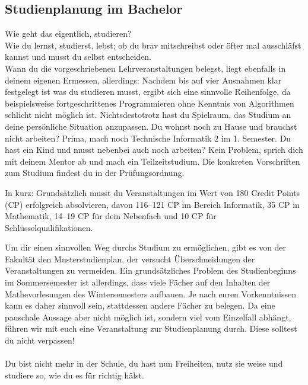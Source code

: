 \subsection{Studienplanung im Bachelor}

Wie geht das eigentlich, studieren?\\
Wie du lernst, studierst, lebst; ob du brav mitschreibst oder öfter mal ausschläfst kannst und musst du selbst entscheiden. \\
Wann du die vorgeschriebenen Lehrveranstaltungen belegst, liegt ebenfalls in deinem eigenen Ermessen, allerdings: Nachdem bis auf vier Ausnahmen klar festgelegt ist was du studieren musst, ergibt sich eine sinnvolle Reihenfolge, da beispielsweise fortgeschrittenes Programmieren ohne Kenntnis von Algorithmen schlicht nicht möglich ist. Nichtsdestotrotz hast du Spielraum, das Studium an deine persönliche Situation anzupassen.
Du wohnst noch zu Hause und brauchst nicht arbeiten? Prima, mach noch Technische Informatik 2 im 1. Semester. Du hast ein Kind und musst nebenbei auch noch arbeiten? Kein Problem, sprich dich mit deinem Mentor ab und mach ein Teilzeitstudium. Die konkreten Vorschriften zum Studium findest du in der Prüfungsordnung.

In kurz: Grundsätzlich musst du Veranstaltungen im Wert von 180 Credit Points (CP) erfolgreich absolvieren, davon 116–121 CP im Bereich Informatik, 35 CP in Mathematik, 14–19 CP für dein Nebenfach und 10 CP für Schlüsselqualifikationen.

Um dir einen sinnvollen Weg durchs Studium zu ermöglichen, gibt es von der Fakultät den Musterstudienplan, der versucht Überschneidungen der Veranstaltungen zu vermeiden. Ein grundsätzliches Problem des Studienbeginns im Sommersemester ist allerdings, dass viele Fächer auf den Inhalten der Mathevorlesungen des Wintersemesters aufbauen. Je nach euren Vorkenntnissen kann es daher sinnvoll sein, stattdessen andere Fächer zu belegen. Da eine pauschale Aussage aber nicht möglich ist, sondern viel vom Einzelfall abhängt, führen wir mit euch eine Veranstaltung zur Studienplanung durch. Diese solltest du nicht verpassen!\\\\
Du bist  nicht mehr in der Schule, du hast nun Freiheiten, nutz sie weise und studiere so, wie du es für richtig hälst. 




